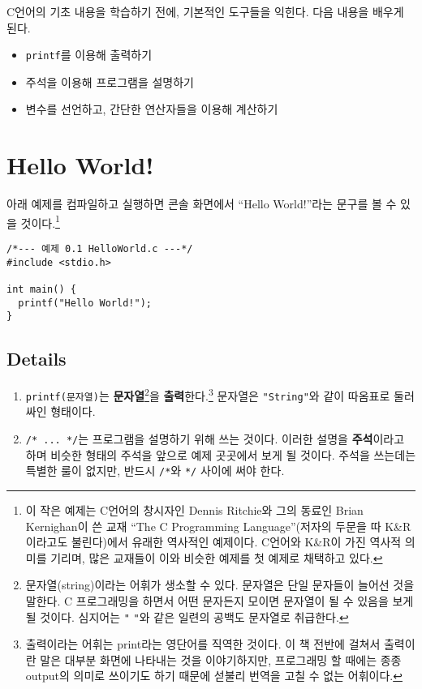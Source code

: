 \documentclass[../main.tex]{subfiles}
\begin{document}
C언어의 기초 내용을 학습하기 전에, 기본적인 도구들을 익힌다. 다음 내용을 배우게 된다.
\begin{itemize}
\item \texttt{printf}를 이용해 출력하기
\item 주석을 이용해 프로그램을 설명하기
\item 변수를 선언하고, 간단한 연산자들을 이용해 계산하기
\end{itemize}

\label{sec:0.1}
\section{Hello World!}

아래 예제를 컴파일하고 실행하면 콘솔 화면에서 ``Hello World!''라는
문구를 볼 수 있을 것이다.\footnote{이 작은 예제는 C언어의 창시자인
  Dennis Ritchie와 그의 동료인 Brian Kernighan이 쓴 교재 ``The C
  Programming Language''(저자의 두문을 따 K\&R이라고도 불린다)에서
  유래한 역사적인 예제이다. C언어와 K\&R이 가진 역사적 의미를 기리며,
  많은 교재들이 이와 비슷한 예제를 첫 예제로 채택하고 있다.}
\begin{verbatim}
/*--- 예제 0.1 HelloWorld.c ---*/
#include <stdio.h>

int main() {
  printf("Hello World!");
}
\end{verbatim}

\subsection{Details}
\begin{enumerate}
\item \texttt{printf(문자열)}는
  \textbf{문자열}\footnote{문자열(string)이라는 어휘가 생소할 수
    있다. 문자열은 단일 문자들이 늘어선 것을 말한다. C 프로그래밍을
    하면서 어떤 문자든지 모이면 문자열이 될 수 있음을 보게 될
    것이다. 심지어는 \texttt{"} \hspace{5mm} \texttt{"}와 같은 일련의
    공백도 문자열로 취급한다.}을 \textbf{출력}한다.\footnote{출력이라는
    어휘는 print라는 영단어를 직역한 것이다. 이 책 전반에 걸쳐서
    출력이란 말은 대부분 화면에 나타내는 것을 이야기하지만, 프로그래밍
    할 때에는 종종 output의 의미로 쓰이기도 하기 때문에 섣불리 번역을
    고칠 수 없는 어휘이다.} 문자열은 \texttt{"String"}와 같이 따옴표로
  둘러싸인 형태이다.
\item \texttt{/* ... */}는 프로그램을 설명하기 위해 쓰는 것이다. 이러한
  설명을 \textbf{주석}이라고 하며 비슷한 형태의 주석을 앞으로 예제
  곳곳에서 보게 될 것이다. 주석을 쓰는데는 특별한 룰이 없지만, 반드시
  \texttt{/*}와 \texttt{*/} 사이에 써야 한다.
\end{enumerate}
\end{document}
